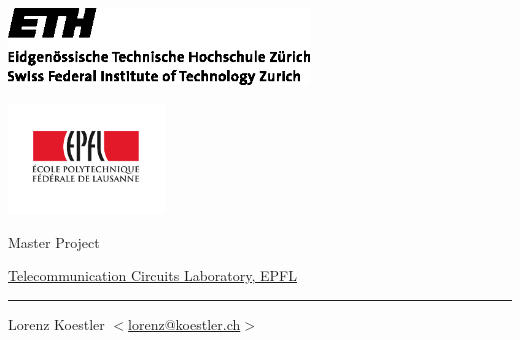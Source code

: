 \begin{center}

  \vspace*{-2cm}
  \begin{minipage}{\textwidth}
    \includegraphics[width=0.6\textwidth]{ethlogo}
    \hfill
    \raggedright
    \includegraphics[width=0.3108\textwidth]{epfl}
  \end{minipage}

  \vspace{3cm}

  \begin{flushright}
    {\LARGE Master Project}\\
    \vspace{5mm}

    \href{http://tcl.epfl.ch}{Telecommunication Circuits Laboratory, EPFL}


    \vspace{1.5cm} {\LARGE \bfseries \mytitle}
    \rule{\textwidth}{0.8mm}

    \vspace{5mm}

    Lorenz Koestler $ < $\href{mailto:lorenz@koestler.ch}{lorenz@koestler.ch}$ > $ \\
    \myterm

    \vspace{5mm}


\end{flushright}
\end{center}
